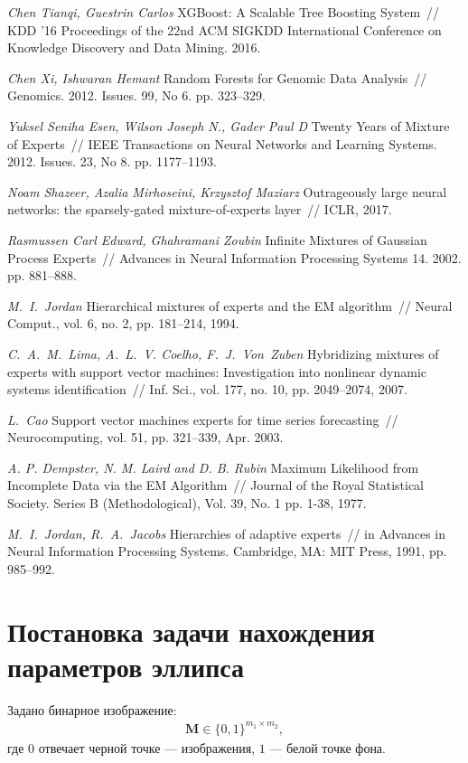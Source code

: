 \documentclass[12pt, twoside]{article}
\numberwithin{equation}{section}
\begin{document}
\begin{thebibliography}{99}
	\textit{Chen Tianqi, Guestrin Carlos} XGBoost: A Scalable Tree Boosting System~// KDD ’16 Proceedings of the 22nd ACM SIGKDD International Conference on Knowledge Discovery and Data Mining. 2016.
	
	\textit{Chen Xi, Ishwaran Hemant} Random Forests for Genomic Data Analysis~// Genomics. 2012. Issues. 99, No 6. pp. 323--329.

	\textit{Yuksel Seniha Esen, Wilson Joseph N., Gader Paul D} Twenty Years of Mixture of Experts~// IEEE Transactions on Neural Networks and Learning Systems. 2012. Issues. 23, No 8. pp. 1177–1193.

	\textit{Noam Shazeer, Azalia Mirhoseini, Krzysztof Maziarz} Outrageously large neural networks: the sparsely-gated mixture-of-experts layer~// ICLR, 2017.

	\textit{Rasmussen Carl Edward, Ghahramani Zoubin} Infinite Mixtures of Gaussian Process Experts~// Advances in Neural Information Processing Systems 14. 2002. pp. 881–888.
	
	\textit{M.~I.~Jordan} Hierarchical mixtures of experts and the EM algorithm~// Neural Comput., vol. 6, no. 2, pp. 181–214, 1994.
	
	\textit{C.~A.~M.~Lima, A.~L.~V. Coelho, F.~J.~Von~Zuben} Hybridizing mixtures of experts with support vector machines: Investigation into nonlinear dynamic systems identification~// Inf. Sci., vol. 177, no. 10, pp. 2049–2074, 2007.

	\textit{L.~Cao} Support vector machines experts for time series forecasting~// Neurocomputing, vol. 51, pp. 321–339, Apr. 2003.

	\textit{A. P. Dempster, N. M. Laird and D. B. Rubin} Maximum Likelihood from Incomplete Data via the EM Algorithm~// Journal of the Royal Statistical Society. Series B (Methodological), Vol. 39, No. 1 pp. 1-38, 1977.
	
	\textit{M.~I.~Jordan, R.~A.~Jacobs} Hierarchies of adaptive experts~// in Advances in Neural Information Processing Systems. Cambridge, MA: MIT Press, 1991, pp. 985–992.

 \end{thebibliography}
 
 \appendix

\section{Постановка задачи нахождения параметров эллипса}\label{apendix:el}
Задано бинарное изображение:
\begin{equation}
\label{apendix:el:eq:1}
\begin{aligned}
\textbf{M} \in \{0,1\}^{m_1 \times m_2},
\end{aligned}
\end{equation}
где $0$ отвечает черной точке --- изображения, $1$ --- белой точке фона.
\end{document}
